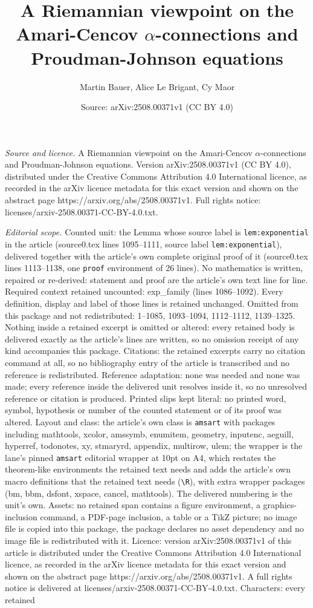 \documentclass[10pt,a4paper]{amsart}
\title[A Riemannian viewpoint on the Amari-Cencov $\alpha$-connecti]{A Riemannian viewpoint on the Amari-Cencov $\alpha$-connections and Proudman-Johnson equations}
\author{Martin Bauer, Alice Le Brigant, Cy Maor}
\date{Source: arXiv:2508.00371v1 (CC BY 4.0)}
\begin{document}
\maketitle

\noindent\emph{Source and licence.} A Riemannian viewpoint on the Amari-Cencov $\alpha$-connections and Proudman-Johnson equations. Version arXiv:2508.00371v1 (CC BY 4.0), distributed under the Creative Commons Attribution 4.0 International licence, as recorded in the arXiv licence metadata for this exact version and shown on the abstract page https://arxiv.org/abs/2508.00371v1. Full rights notice: licenses/arxiv-2508.00371-CC-BY-4.0.txt.\par\smallskip

\noindent\textit{Editorial scope.} Counted unit: the Lemma whose source label is \texttt{lem:exponential} in the article (source0.tex lines 1095--1111, source label \texttt{lem:exponential}), delivered together with the article's own complete original proof of it (source0.tex lines 1113--1138, one \texttt{proof} environment of 26 lines). No mathematics is written, repaired or re-derived: statement and proof are the article's own text line for line. Required context retained uncounted: exp\_family (lines 1086--1092). Every definition, display and label of those lines is retained unchanged. Omitted from this package and not redistributed: 1--1085, 1093--1094, 1112--1112, 1139--1325. Nothing inside a retained excerpt is omitted or altered: every retained body is delivered exactly as the article's lines are written, so no omission receipt of any kind accompanies this package. Citations: the retained excerpts carry no citation command at all, so no bibliography entry of the article is transcribed and no reference is redistributed. Reference adaptation: none was needed and none was made; every reference inside the delivered unit resolves inside it, so no unresolved reference or citation is produced. Printed slips kept literal: no printed word, symbol, hypothesis or number of the counted statement or of its proof was altered. Layout and class: the article's own class is \texttt{amsart} with packages including mathtools, xcolor, amssymb, enumitem, geometry, inputenc, aeguill, hyperref, todonotes, xy, stmaryrd, appendix, multirow, ulem; the wrapper is the lane's pinned \texttt{amsart} editorial wrapper at 10pt on A4, which restates the theorem-like environments the retained text needs and adds the article's own macro definitions that the retained text needs (\texttt{\textbackslash R}), with extra wrapper packages (bm, bbm, dsfont, xspace, cancel, mathtools). The delivered numbering is the unit's own. Assets: no retained span contains a figure environment, a graphics-inclusion command, a PDF-page inclusion, a table or a TikZ picture; no image file is copied into this package, the package declares no asset dependency and no image file is redistributed with it. Licence: version arXiv:2508.00371v1 of this article is distributed under the Creative Commons Attribution 4.0 International licence, as recorded in the arXiv licence metadata for this exact version and shown on the abstract page https://arxiv.org/abs/2508.00371v1. A full rights notice is delivered at licenses/arxiv-2508.00371-CC-BY-4.0.txt. Characters: every retained 
\end{document}
